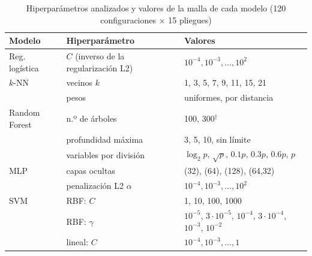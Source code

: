 \begin{table}[!t]
\caption{Hiperparámetros analizados y valores de la malla de cada modelo (120 configuraciones $\times$ 15 pliegues)}
\label{tab:grids}
\centering\footnotesize
\setlength{\tabcolsep}{2.5pt}\renewcommand{\arraystretch}{1.05}
\begin{tabular}{@{}p{1.95cm} p{2.85cm} p{3.45cm}@{}}
\toprule
Modelo & Hiperparámetro & Valores\\
\midrule
Reg. logística & $C$ (inverso de la regularización L2) & $10^{-4},10^{-3},\dots,10^{2}$\\
\addlinespace[1pt]
$k$-NN & vecinos $k$ & 1, 3, 5, 7, 9, 11, 15, 21\\
 & pesos & uniformes, por distancia\\
\addlinespace[1pt]
Random Forest & n.º de árboles & 100, 300$^{\dagger}$\\
 & profundidad máxima & 3, 5, 10, sin límite\\
 & variables por división & $\log_2 p$, $\sqrt p$, $0.1p$, $0.3p$, $0.6p$, $p$\\
\addlinespace[1pt]
MLP & capas ocultas & (32), (64), (128), (64,32)\\
 & penalización L2 $\alpha$ & $10^{-4},10^{-3},\dots,10^{2}$\\
\addlinespace[1pt]
SVM & RBF: $C$ & 1, 10, 100, 1000\\
 & RBF: $\gamma$ & $10^{-5}$, $3\cdot10^{-5}$, $10^{-4}$, $3\cdot10^{-4}$, $10^{-3}$, $10^{-2}$\\
 & lineal: $C$ & $10^{-4},10^{-3},\dots,1$\\
\bottomrule
\end{tabular}
\par\smallskip{}
\end{table}

